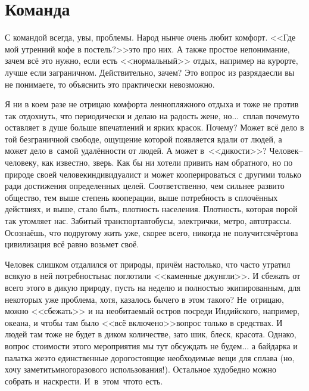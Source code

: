 \chapter{Команда} 
\vepsianrose

С командой всегда, увы, проблемы. Народ нынче очень любит комфорт. <<Где мой утренний кофе в постель?>>\mdash это про них. А также простое непонимание, зачем всё это нужно, если есть <<нормальный>> отдых, например на курорте, лучше если заграничном. Действительно, зачем? Это вопрос из разряда\mdash если вы не понимаете, то объяснить это практически невозможно. 

Я ни в коем разе не отрицаю комфорта ленно\sdash пляжного отдыха и тоже не против так отдохнуть, что периодически и делаю на радость жене, но$\ldots$~сплав почему\sdash то оставляет в душе больше впечатлений и ярких красок. Почему? Может всё дело в той безграничной свободе, ощущение которой появляется вдали от людей, а может дело в~самой удалённости от людей. А может в~<<дикости>>? Человек\thinspace--\thinspace человеку, как известно, зверь. Как бы ни хотели привить нам обратного, но по природе своей человек\mdash индивидуалист и может кооперироваться с другими только ради достижения определенных целей. Соответственно, чем сильнее развито общество, тем выше степень кооперации, выше потребность в сплочённых действиях, и выше, стало быть, плотность населения. Плотность, которая порой так утомляет нас. Забитый транспорт\mdash автобусы, электрички, метро, автотрассы. Осознаёшь, что по\sdash другому жить уже, скорее всего, никогда не получится\mdash чёртова цивилизация всё равно возьмет своё.

Человек слишком отдалился от природы, причём настолько, что часто утратил всякую в ней потребность\mdash нас поглотили <<каменные джунгли>>. И сбежать от всего этого в дикую природу, пусть на неделю и полностью экипированным, для некоторых уже проблема, хотя, казалось бы\mdash чего в этом такого? Не~отрицаю, можно <<сбежать>> и на необитаемый остров посреди Индийского, например, океана, и чтобы там было <<всё включено>>\mdash вопрос только в средствах. И людей там тоже не будет в диком количестве, зато шик, блеск, красота. Однако, вопрос стоимости этого мероприятия мы тут обсуждать не будем$\ldots$ а байдарка и палатка же\mdash это единственные дорогостоящие необходимые вещи для сплава (но, хочу заметить\mdash многоразового использования!). Остальное худо\sdash бедно можно собрать и~наскрести. И~в~этом~что\sdash то есть. 

